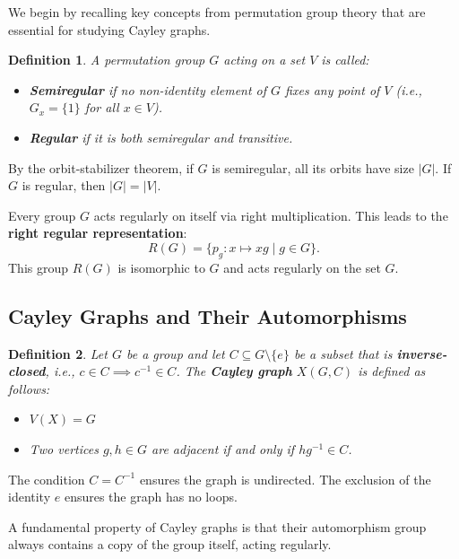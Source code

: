 \documentclass[12pt,a4paper,openany]{book}
\newtheorem{definition}{Definition}[section]
\begin{document}

We begin by recalling key concepts from permutation group theory that are essential for studying Cayley graphs.

\begin{definition}
A permutation group $G$ acting on a set $V$ is called:
\begin{itemize}
    \item \textbf{Semiregular} if no non-identity element of $G$ fixes any point of $V$ (i.e., $G_x = \{1\}$ for all $x \in V$).
    \item \textbf{Regular} if it is both semiregular and transitive.
\end{itemize}
\end{definition}

By the orbit-stabilizer theorem, if $G$ is semiregular, all its orbits have size $|G|$. If $G$ is regular, then $|G| = |V|$.

Every group $G$ acts regularly on itself via right multiplication. This leads to the \textbf{right regular representation}:
\[
R(G) = \{ p_g : x \mapsto xg \mid g \in G \}.
\]
This group $R(G)$ is isomorphic to $G$ and acts regularly on the set $G$.

\subsection{Cayley Graphs and Their Automorphisms}

\begin{definition}
Let $G$ be a group and let $C \subseteq G \setminus \{e\}$ be a subset that is \textbf{inverse-closed}, i.e., $c \in C \implies c^{-1} \in C$. The \textbf{Cayley graph} $X(G, C)$ is defined as follows:
\begin{itemize}
    \item $V(X) = G$
    \item Two vertices $g, h \in G$ are adjacent if and only if $hg^{-1} \in C$.
\end{itemize}
\end{definition}

The condition $C = C^{-1}$ ensures the graph is undirected. The exclusion of the identity $e$ ensures the graph has no loops.

A fundamental property of Cayley graphs is that their automorphism group always contains a copy of the group itself, acting regularly.
\end{document}
